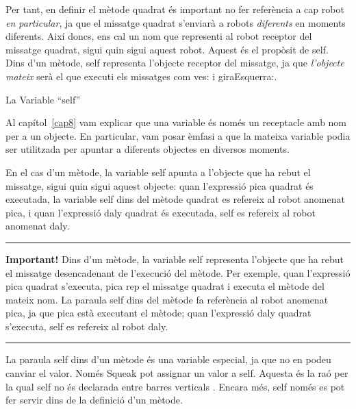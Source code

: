 Per tant, en definir el mètode \textsf{quadrat} és important no fer referència a cap robot \emph{en particular}, ja que el missatge \textsf{quadrat} s'enviarà a robots \emph{diferents} en moments diferents. Així doncs, ens cal un nom que representi al robot receptor del missatge \textsf{quadrat}, sigui quin sigui aquest robot. Aquest és el propòsit de \textsf{self}. Dins d'un mètode, \textsf{self} representa l'objecte receptor del missatge, ja que \emph{l'objecte mateix} serà el que executi els missatges com \textsf{ves:} i \textsf{giraEsquerra:}.
\vspace*{4mm}

\noindent
{\large La Variable ``self''}
\vspace*{3mm}

Al capítol~\ref{cap8} vam explicar que una variable és només un receptacle amb nom per a un objecte. En particular, vam posar èmfasi a que la mateixa variable podia ser utilitzada per apuntar a diferents objectes en diversos moments. 

En el cas d'un mètode, la variable \textsf{self} apunta a l'objecte que ha rebut el missatge, sigui quin sigui aquest objecte: quan l'expressió \textsf{pica quadrat} és executada, la variable \textsf{self} dins del mètode \textsf{quadrat} es refereix al robot anomenat \textsf{pica}, i quan l'expressió \textsf{daly quadrat} és executada, \textsf{self} es refereix al robot anomenat \textsf{daly}.
\vspace*{3mm}

\noindent
\rule{\textwidth}{2pt}
\noindent
\textbf{Important!} Dins d'un mètode, la variable \textsf{self} representa l'objecte que ha rebut el missatge desencadenant de l'execució del mètode. Per exemple, quan l'expressió \textsf{pica quadrat} s'executa, \textsf{pica} rep el missatge \textsf{quadrat} i executa el mètode del mateix nom. La paraula \textsf{self} dins del mètode fa referència al robot anomenat \textsf{pica}, ja que \textsf{pica} està executant el mètode; quan l'expressió \textsf{daly quadrat} s'executa, \textsf{self} es refereix al robot \textsf{daly}.\\
\noindent
\rule{\textwidth}{2pt}
\vspace*{1mm}

La paraula \textsf{self} dins d'un mètode és una variable especial, ja que no en podeu canviar el valor. Només Squeak pot assignar un valor a \textsf{self}. Aquesta és la raó per la qual \textsf{self} no és declarada entre barres verticals \textbar \hspace{2mm} \textbar . Encara més, \textsf{self}  només es pot fer servir dins de la definició d'un mètode.
\vspace*{3mm}

